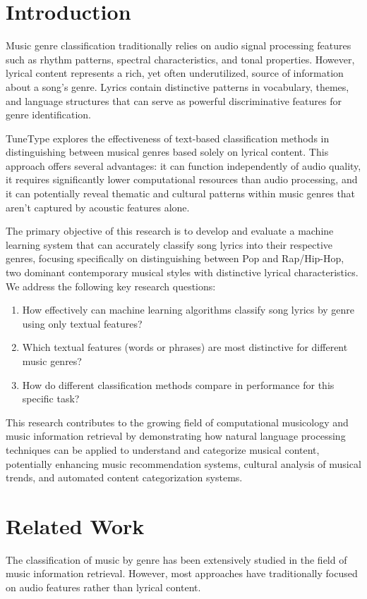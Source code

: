 \documentclass[conference]{IEEEtran}
\begin{document}
\section{Introduction}
Music genre classification traditionally relies on audio signal processing features such as rhythm patterns, spectral characteristics, and tonal properties. However, lyrical content represents a rich, yet often underutilized, source of information about a song's genre. Lyrics contain distinctive patterns in vocabulary, themes, and language structures that can serve as powerful discriminative features for genre identification.

TuneType explores the effectiveness of text-based classification methods in distinguishing between musical genres based solely on lyrical content. This approach offers several advantages: it can function independently of audio quality, it requires significantly lower computational resources than audio processing, and it can potentially reveal thematic and cultural patterns within music genres that aren't captured by acoustic features alone.

The primary objective of this research is to develop and evaluate a machine learning system that can accurately classify song lyrics into their respective genres, focusing specifically on distinguishing between Pop and Rap/Hip-Hop, two dominant contemporary musical styles with distinctive lyrical characteristics. We address the following key research questions:

\begin{enumerate}
\item How effectively can machine learning algorithms classify song lyrics by genre using only textual features?
\item Which textual features (words or phrases) are most distinctive for different music genres?
\item How do different classification methods compare in performance for this specific task?
\end{enumerate}

This research contributes to the growing field of computational musicology and music information retrieval by demonstrating how natural language processing techniques can be applied to understand and categorize musical content, potentially enhancing music recommendation systems, cultural analysis of musical trends, and automated content categorization systems.

\section{Related Work}
The classification of music by genre has been extensively studied in the field of music information retrieval. However, most approaches have traditionally focused on audio features rather than lyrical content.
\end{document}
